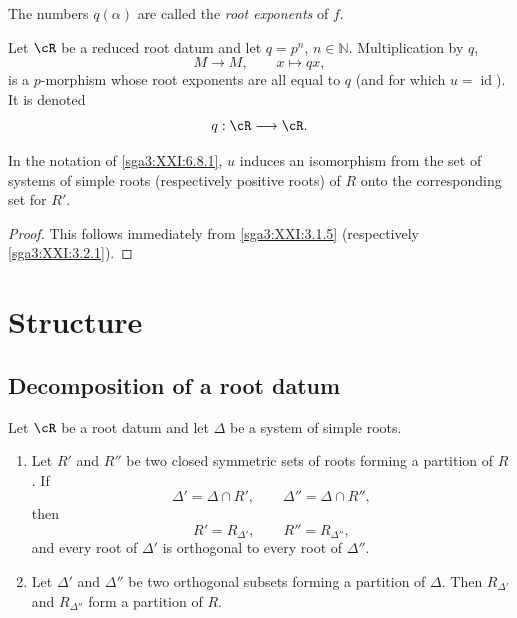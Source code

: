 \begin{definition}\label{sga3:XXI:6.8.5}
The numbers \(q(\alpha)\) are called the \emph{root exponents} of
\(f\).
\end{definition}

\begin{example}\label{sga3:XXI:6.8.6}
Let \(\cR\) be a reduced root datum and let
\(q=p^n\), \(n\in\mathbb N\). Multiplication by \(q\),
\[
 M\longrightarrow M,\qquad x\longmapsto qx,
\]
is a \(p\)-morphism whose root exponents are all equal to \(q\)
(and for which \(u=\operatorname{id}\)). It is denoted
\[
 q:\cR\longrightarrow\cR.
\]
\end{example}


\begin{proposition}\label{sga3:XXI:6.8.7}
In the notation of \ref{sga3:XXI:6.8.1}, \(u\) induces an
isomorphism from the set of systems of simple roots (respectively
positive roots) of \(R\) onto the corresponding set for \(R'\).
\end{proposition}

\begin{proof}
This follows immediately from \ref{sga3:XXI:3.1.5}
(respectively \ref{sga3:XXI:3.2.1}).
\end{proof}

\section{Structure}\label{sga3:XXI:7}

\subsection{Decomposition of a root datum}\label{sga3:XXI:7.1}

\begin{proposition}\label{sga3:XXI:7.1.1}
Let \(\cR\) be a root datum and let \(\Delta\) be a system of
simple roots.
\begin{enumerate}
\item[\SGAInlineRefTarget{sga3:XXI:7.1.1:item:i}(i)] Let \(R'\) and \(R''\) be two closed symmetric sets of
  roots forming a partition of \(R\). If
  \[
   \Delta'=\Delta\cap R',
   \qquad
   \Delta''=\Delta\cap R'',
  \]
  then
  \[
   R'=R_{\Delta'},
   \qquad
   R''=R_{\Delta''},
  \]
  and every root of \(\Delta'\) is orthogonal to every root of
  \(\Delta''\).
\item[\SGAInlineRefTarget{sga3:XXI:7.1.1:item:ii}(ii)] Let \(\Delta'\) and \(\Delta''\) be two orthogonal
  subsets forming a partition of \(\Delta\). Then
  \(R_{\Delta'}\) and \(R_{\Delta''}\) form a partition of \(R\).
\end{enumerate}
\end{proposition}

